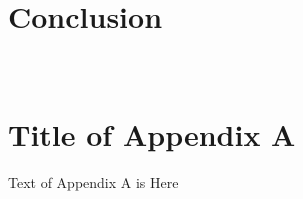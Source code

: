 \documentclass[a4paper,10pt]{article}
\theoremstyle{definition}
\begin{document}
\pagebreak
\tableofcontents

\pagebreak


\pagebreak


\pagebreak


\pagebreak


\pagebreak


\pagebreak
\section{Conclusion}

\pagebreak
\appendix
\section{\\Title of Appendix A}

Text of Appendix A is Here

\pagebreak


\end{document}

